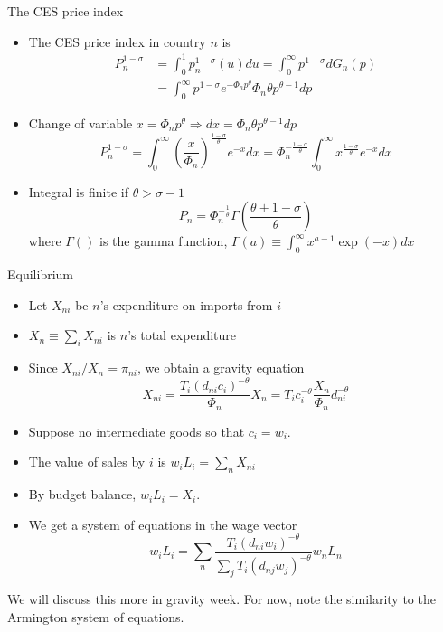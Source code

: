 \documentclass[11pt,notes=hide,aspectratio=169]{beamer}
\begin{document}
\begin{frame}{The CES price index}
\begin{itemize}
\item The CES price index in country $n$ is 
\begin{align*}
P_{n}^{1-\sigma } 
&=\int_{0}^{1}p_{n}^{1-\sigma }(u) du 
=\int_{0}^{\infty }p^{1-\sigma }dG_{n}\left( p\right) \\
&=\int_{0}^{\infty }p^{1-\sigma }e^{-\Phi _{n}p^{\theta }}\Phi _{n}\theta
p^{\theta -1}dp
\end{align*}
\item Change of variable $x=\Phi _{n}p^{\theta }\Rightarrow
dx=\Phi _{n}\theta p^{\theta -1}dp$
\begin{equation*}
P_{n}^{1-\sigma }
=\int_{0}^{\infty }\left( \frac{x}{\Phi _{n}}\right) ^{\frac{1-\sigma }{\theta }}e^{-x}dx
=\Phi _{n}^{-\frac{1-\sigma }{\theta }}\int_{0}^{\infty }x^{\frac{1-\sigma 
}{\theta }}e^{-x}dx
\end{equation*}
\item Integral is finite if $\theta>\sigma-1$
\begin{equation*}
P_{n} = \Phi _{n}^{-\frac{1}{\theta }} \Gamma \left( \frac{\theta +1-\sigma }{\theta }\right)
\end{equation*}
where $\Gamma()$ is the gamma function, $\Gamma(a)\equiv \int_{0}^{\infty} x^{a-1} \exp(-x)dx$
\end{itemize}
\end{frame}
\begin{frame}{Equilibrium}
\begin{itemize}
	\item Let $X_{ni}$ be $n$'s expenditure on imports from $i$
	\item $X_n \equiv \sum_{i} X_{ni}$ is $n$'s total expenditure
	\item Since $X_{ni} / X_n = \pi_{ni}$, we obtain a gravity equation
	\begin{equation*} 
	X_{ni} 
	= \frac{T_{i}\left( d _{ni}c_{i}\right) ^{-\theta}}{\Phi_n} X_n 
	= T_{i}c_{i}^{-\theta} \frac{X_n}{\Phi_n} d_{ni}^{-\theta} 
	\end{equation*}
	\item Suppose no intermediate goods so that $c_i = w_i$.
	\item The value of sales by $i$ is $w_i L_i = \sum_{n} X_{ni}$
	\item By budget balance, $w_i L_i = X_i$.
	\item We get a system of equations in the wage vector
		\begin{equation*}w_i L_i = \sum_n \frac{T_{i}\left( d _{ni}w_{i}\right) ^{-\theta}}{\sum _j T_{i}\left( d _{nj}w_{j}\right) ^{-\theta}} w_n L_n
		\end{equation*}
\end{itemize}
We will discuss this more in gravity week. For now, note the similarity to the Armington system of equations.
\end{frame}
\end{document}
